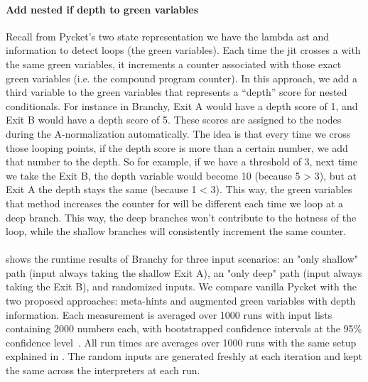     \paragraph{Add nested if depth to green variables}%
      Recall from Pycket's two state representation we have the lambda \gls{ast} and  information to detect loops (the green variables). Each time the \gls{jit} crosses a  with the same green variables, it increments a counter associated with those exact green variables (i.e. the compound program counter). In this approach, we add a third variable to the green variables that represents a “depth” score for nested conditionals. For instance in Branchy, Exit A would have a depth score of 1, and Exit B would have a depth score of 5. These scores are assigned to the  nodes during the A-normalization automatically. The idea is that every time we cross those looping points, if the depth score is more than a certain number, we add that number to the depth. So for example, if we have a threshold of 3, next time we take the Exit B, the depth variable would become 10 (because 5 > 3), but at Exit A the depth stays the same (because 1 < 3). This way, the green variables that  method increases the counter for will be different each time we loop at a deep branch. This way, the deep branches won't contribute to the hotness of the loop, while the shallow branches will consistently increment the same counter.


    \paragraph{}%
       shows the runtime results of Branchy for three input scenarios: an "only shallow" path (input always taking the shallow Exit A), an "only deep" path (input always taking the Exit B), and randomized inputs. We compare vanilla Pycket with the two proposed approaches: meta-hints and augmented green variables with depth information. Each measurement is averaged over 1000 runs with input lists containing 2000 numbers each, with bootstrapped confidence intervals at the 95\% confidence level~\cite{davisonBootstrapMethods2013}. All run times are averages over 1000 runs with the same setup explained in . The random inputs are generated freshly at each iteration and kept the same across the interpreters at each run.

